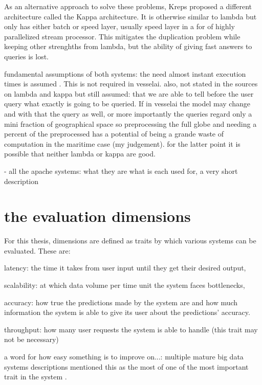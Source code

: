 As an alternative approach to solve these problems, Kreps proposed a different architecture called the Kappa architecture. It is otherwise similar to lambda but only has either batch or speed layer, usually speed layer in a for of highly parallelized stream processor. This mitigates the duplication problem while keeping other strenghths from lambda, but the ability of giving fast answers to queries is lost.


fundamental assumptions of both systems:  the need almost instant execution times is assumed \cite{lambdakappa}. This is not required in vesselai. also, not stated in the sources on lambda and kappa but still assumed: that we are able to tell before the user query what exactly is going to be queried. If in vesselai the model may change and with that the query as well, or more importantly the queries regard only a mini fraction of geographical space so preprocessing the full globe and needing a percent of the preprocessed has a potential of being a grande waste of computation in the maritime case (my judgement). for the latter point it is possible that neither lambda or kappa are good.

- all the apache systems: what they are what is each used for, a very short description


\section{the evaluation dimensions}

For this thesis, dimensions are defined as traits by which various systems can be evaluated. These are:

latency: the time it takes from user input until they get their desired output,

scalability: at which data volume per time unit the system faces bottlenecks,

accuracy: how true the predictions made by the system are and how much information the system is able to give its user about the predictions' accuracy.

throughput: how many user requests the system is able to handle (this trait may not be necessary)

a word for how easy something is to improve on...: multiple mature big data systems descriptions mentioned this as the most of one of the most important trait in the system \cite{uber} \cite{facebook}.

